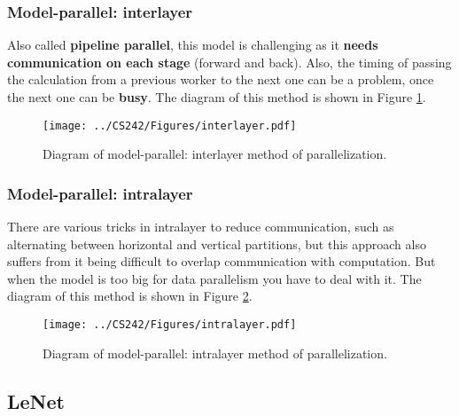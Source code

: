 \documentclass[abstract=true]{scrartcl}
\begin{document}
\subsubsection{Model-parallel: interlayer}
Also called \textbf{pipeline parallel}, this model is challenging as it \textbf{needs communication on each stage} (forward and back). Also, the timing of passing the calculation from a previous worker to the next one can be a problem, once the next one can be \textbf{busy}.
The diagram of this method is shown in Figure \ref{fig:interlayer}.
\begin{figure}
    \centering
    \texttt{[image: ../CS242/Figures/interlayer.pdf]}
    \caption{Diagram of model-parallel: interlayer method of parallelization.}
    \label{fig:interlayer}
\end{figure}

\subsubsection{Model-parallel: intralayer}
There are various tricks in intralayer to reduce communication, such as alternating between horizontal and vertical partitions, but this approach also suffers from it being difficult to overlap communication with computation. But when the model is too big for data parallelism you have to deal with it.
The diagram of this method is shown in Figure \ref{fig:intralayer}.
\begin{figure}
    \centering
    \texttt{[image: ../CS242/Figures/intralayer.pdf]}
    \caption{Diagram of model-parallel: intralayer method of parallelization.}
    \label{fig:intralayer}
\end{figure}

\subsection{LeNet}





\end{document}
